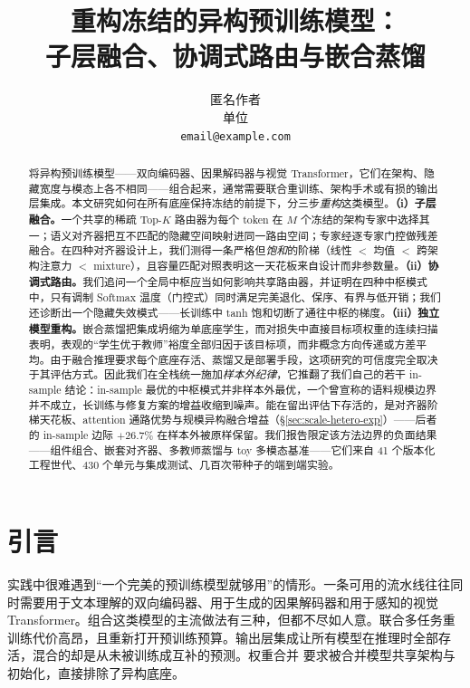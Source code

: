 \documentclass[10pt,twoside]{article}
\title{重构冻结的异构预训练模型：\\ 子层融合、协调式路由与嵌合蒸馏}
\author{
    匿名作者\\
    单位\\
    \texttt{email@example.com}
}
\theoremstyle{definition}
\theoremstyle{plain}
\theoremstyle{remark}
\begin{document}
\maketitle

\begin{abstract}
将异构预训练模型——双向编码器、因果解码器与视觉 Transformer，它们在架构、隐藏宽度与模态上各不相同——组合起来，通常需要联合重训练、架构手术或有损的输出层集成。本文研究如何在所有底座保持冻结的前提下，分三步\emph{重构}这类模型。\textbf{（i）子层融合。}一个共享的稀疏 Top-$K$ 路由器为每个 token 在 $M$ 个冻结的架构专家中选择其一；语义对齐器把互不匹配的隐藏空间映射进同一路由空间；专家经逐专家门控做残差融合。在四种对齐器设计上，我们测得一条严格但\emph{饱和}的阶梯（线性 $<$ 均值 $<$ 跨架构注意力 $<$ mixture），且容量匹配对照表明这一天花板来自设计而非参数量。\textbf{（ii）协调式路由。}我们追问一个全局中枢应当如何影响共享路由器，并证明在四种中枢模式中，只有调制 Softmax 温度（门控式）同时满足完美退化、保序、有界与低开销；我们还诊断出一个隐藏失效模式——长训练中 tanh 饱和切断了通往中枢的梯度。\textbf{（iii）独立模型重构。}嵌合蒸馏把集成坍缩为单底座学生，而对损失中直接目标项权重的连续扫描表明，表观的``学生优于教师''裕度全部归因于该目标项，而非概念方向传递或方差平均。由于融合推理要求每个底座存活、蒸馏又是部署手段，这项研究的可信度完全取决于其评估方式。因此我们在全栈统一施加\emph{样本外纪律}，它推翻了我们自己的若干 in-sample 结论：in-sample 最优的中枢模式并非样本外最优，一个曾宣称的语料规模边界并不成立，长训练与修复方案的增益收缩到噪声。能在留出评估下存活的，是对齐器阶梯天花板、attention 通路优势与规模异构融合增益（\S\ref{sec:scale-hetero-exp}）——后者的 in-sample 边际 $+26.7\%$ 在样本外被原样保留。我们报告限定该方法边界的负面结果——组件组合、嵌套对齐器、多教师蒸馏与 toy 多模态基准——它们来自 41 个版本化工程世代、430 个单元与集成测试、几百次带种子的端到端实验。
\end{abstract}

\section{引言}
\label{sec:intro}

实践中很难遇到``一个完美的预训练模型就够用''的情形。一条可用的流水线往往同时需要用于文本理解的双向编码器、用于生成的因果解码器和用于感知的视觉 Transformer。组合这类模型的主流做法有三种，但都不尽如人意。联合多任务重训练代价高昂，且重新打开预训练预算。输出层集成让所有模型在推理时全部存活，混合的却是从未被训练成互补的预测。权重合并 \citep{ilharco2023,yadav2023,wortsman2022} 要求被合并模型共享架构与初始化，直接排除了异构底座。
\end{document}
